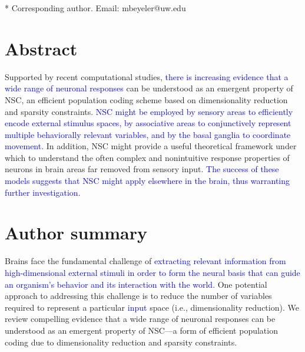 \documentclass[10pt,letterpaper]{article}
\newcommand{\revise}[1]{\textcolor{blue}{#1}}
\begin{document}
\begin{flushleft}


* Corresponding author. Email: mbeyeler@uw.edu




\end{flushleft}
\section*{Abstract}
Supported by recent computational studies,
\revise{there is increasing evidence that a wide range of neuronal responses}
can be understood as an emergent property of \acf{NSC},
an efficient population coding scheme based on
dimensionality reduction and sparsity constraints.
\revise{\acs{NSC} might be employed
by sensory areas to efficiently encode external stimulus spaces,
by associative areas to conjunctively represent multiple behaviorally
relevant variables,
and by the basal ganglia to coordinate movement.}
In addition, \acs{NSC} might provide a useful theoretical framework under which
to understand the often complex and nonintuitive response properties
of neurons in brain areas far removed from sensory input.
\revise{The success of these models suggests that 
\acs{NSC} might apply elsewhere in the brain,
thus warranting further investigation.}




\section*{Author summary}

Brains face the fundamental challenge of \revise{extracting relevant information
from high-dimensional external stimuli in order to form the neural basis
that can guide an organism's behavior and its interaction with the world.}
One potential approach to addressing this challenge is 
to reduce the number of variables required to represent a particular \revise{input} space
(i.e., dimensionality reduction).
We review compelling evidence that a wide range of neuronal responses 
can be understood as an emergent property of \acf{NSC}---a form of 
efficient population coding due to dimensionality reduction and sparsity constraints.


\linenumbers









\nolinenumbers


\appendix


\end{document}

